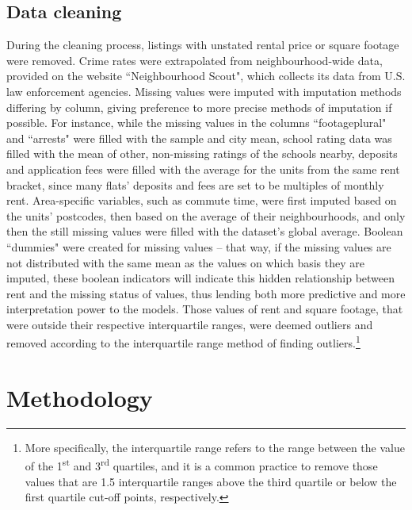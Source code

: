 \documentclass[12pt]{report}
\begin{document}
\subsection{Data cleaning}
During the cleaning process, listings with unstated rental price or square footage were removed. Crime rates were extrapolated from neighbourhood-wide data, provided on the website ``Neighbourhood Scout", which collects its data from U.S. law enforcement agencies. Missing values were imputed with imputation methods differing by column, giving preference to more precise methods of imputation if possible. For instance, while the missing values in the columns ``footageplural" and ``arrests" were filled with the sample and city mean, school rating data was filled with the mean of other, non-missing ratings of the schools nearby, deposits and application fees were filled with the average for the units from the same rent bracket, since many flats' deposits and fees are set to be multiples of monthly rent. Area-specific variables, such as commute time, were first imputed based on the units' postcodes, then based on the average of their neighbourhoods, and only then the still missing values were filled with the dataset's global average. Boolean ``dummies" were created for missing values -- that way, if the missing values are not distributed with the same mean as the values on which basis they are imputed, these boolean indicators will indicate this hidden relationship between rent and the missing status of values, thus lending both more predictive and more interpretation power to the models.
Those values of rent and square footage, that were outside their respective interquartile ranges, were deemed outliers and removed according to the interquartile range method of finding outliers.\footnote{More specifically, the interquartile range refers to the range between the value of the 1\textsuperscript{st} and 3\textsuperscript{rd} quartiles, and it is a common practice to remove those values that are 1.5 interquartile ranges above the third quartile or below the first quartile cut-off points, respectively.}

\section{Methodology}
\end{document}
